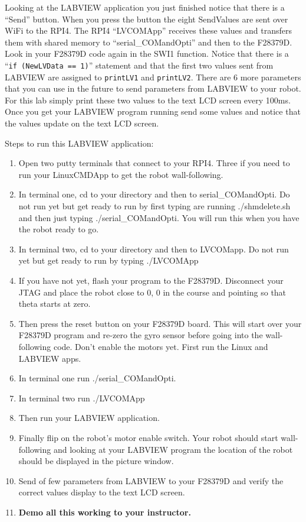 \documentclass[11pt]{article}
\begin{document}
    Looking at the LABVIEW application you just finished notice that there is a “Send” button. When you press the button the eight SendValues are sent over WiFi to the RPI4. The RPI4 “LVCOMApp” receives these values and transfers them with shared memory to “serial\_COMandOpti” and then to the F28379D. Look in your F28379D code again in the SWI1 function. Notice that there is a “\texttt{if (NewLVData == 1)}” statement and that the first two values sent from LABVIEW are assigned to \texttt{printLV1} and \texttt{printLV2}. There are 6 more parameters that you can use in the future to send parameters from LABVIEW to your robot. For this lab simply print these two values to the text LCD screen every 100ms. Once you get your LABVIEW program running send some values and notice that the values update on the text LCD screen.

    Steps to run this LABVIEW application:
    \begin{enumerate}
        \item Open two putty terminals that connect to your RPI4. Three if you need to run your LinuxCMDApp to get the robot wall-following.
        \item In terminal one, cd to your directory and then to serial\_COMandOpti. Do not run yet but get ready to run by first typing are running ./shmdelete.sh and then just typing ./serial\_COMandOpti. You will run this when you have the robot ready to go.
        \item In terminal two, cd to your directory and then to LVCOMapp. Do not run yet but get ready to run by typing ./LVCOMApp
        \item If you have not yet, flash your program to the F28379D. Disconnect your JTAG and place the robot close to 0, 0 in the course and pointing so that theta starts at zero.
        \item Then press the reset button on your F28379D board. This will start over your F28379D program and re-zero the gyro sensor before going into the wall-following code. Don’t enable the motors yet. First run the Linux and LABVIEW apps.
        \item In terminal one run ./serial\_COMandOpti.
        \item In terminal two run ./LVCOMApp
        \item Then run your LABVIEW application.
        \item Finally flip on the robot’s motor enable switch. Your robot should start wall-following and looking at your LABVIEW program the location of the robot should be displayed in the picture window.
        \item Send of few parameters from LABVIEW to your F28379D and verify the correct values display to the text LCD screen.
        \item \mbox{}
            \begin{checkoff}
                    \textbf{Demo all this working to your instructor.}
            \end{checkoff}
    \end{enumerate}
\end{document}
